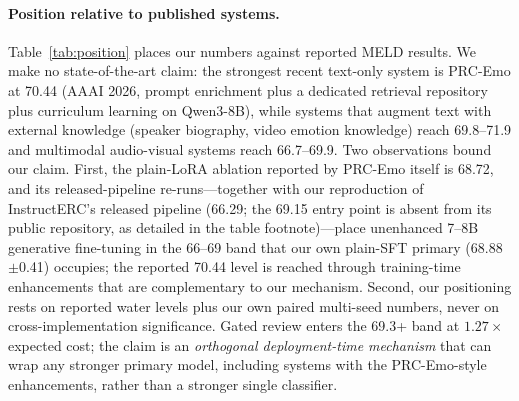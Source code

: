 \documentclass[final,5p,times,twocolumn]{elsarticle}
\begin{document}
\paragraph{Position relative to published systems.}
Table~\ref{tab:position} places our numbers against reported MELD results.
We make no state-of-the-art claim: the strongest recent text-only system is
PRC-Emo at 70.44 (AAAI 2026, prompt enrichment plus a dedicated retrieval
repository plus curriculum learning on Qwen3-8B), while systems that augment
text with external knowledge (speaker biography, video emotion knowledge)
reach 69.8--71.9 and multimodal audio-visual systems reach 66.7--69.9. Two observations bound our claim. First, the plain-LoRA
ablation reported by PRC-Emo itself is 68.72, and its released-pipeline
re-runs---together with our reproduction of InstructERC's released pipeline
(66.29; the 69.15 entry point is absent from its public repository, as
detailed in the table footnote)---place unenhanced 7--8B generative
fine-tuning in the 66--69 band that our own plain-SFT primary
(68.88$\pm$0.41) occupies; the reported 70.44 level is reached through
training-time enhancements that are complementary to our mechanism.
Second, our positioning rests on reported water levels plus our own paired
multi-seed numbers, never on cross-implementation significance. Gated
review enters the 69.3+ band at $1.27\times$ expected cost; the claim is an
\emph{orthogonal deployment-time mechanism} that can wrap any stronger
primary model, including systems with the PRC-Emo-style enhancements,
rather than a stronger single classifier.
\end{document}
